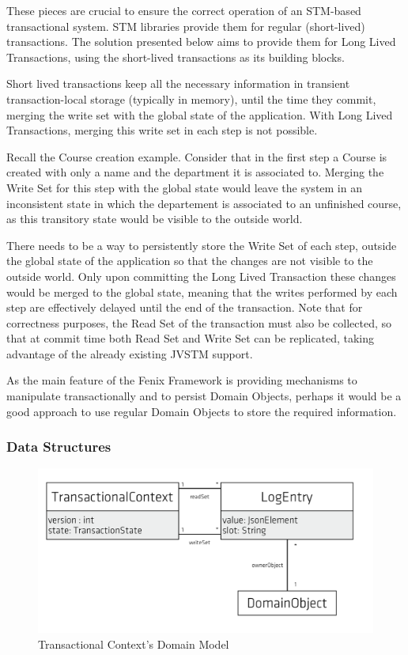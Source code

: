 \documentclass{llncs}
\begin{document}
These pieces are crucial to ensure the correct operation of an
STM-based transactional system. STM libraries provide them for regular
(short-lived) transactions. The solution presented below aims to
provide them for Long Lived Transactions, using the short-lived
transactions as its building blocks.

Short lived transactions keep all the necessary information in
transient transaction-local storage (typically in memory), until the
time they commit, merging the write set with the global state of the
application. With Long Lived Transactions, merging this write set in
each step is not possible.

Recall the Course creation example. Consider that in the first step a
Course is created with only a name and the department it is associated
to. Merging the Write Set for this step with the global state would
leave the system in an inconsistent state in which the departement is
associated to an unfinished course, as this transitory state would be
visible to the outside world.

There needs to be a way to persistently store the Write Set of each
step, outside the global state of the application so that the changes
are not visible to the outside world. Only upon committing the Long
Lived Transaction these changes would be merged to the global state,
meaning that the writes performed by each step are effectively delayed
until the end of the transaction. Note that for correctness purposes,
the Read Set of the transaction must also be collected, so that at
commit time both Read Set and Write Set can be replicated, taking
advantage of the already existing JVSTM support.

As the main feature of the Fenix Framework is providing mechanisms to
manipulate transactionally and to persist Domain Objects, perhaps it
would be a good approach to use regular Domain Objects to store the
required information.

\subsubsection{Data Structures}

\begin{figure}
\centering
\includegraphics[width=0.5\linewidth]{tx-context}
\caption{Transactional Context's Domain Model}
\label{fig:transactionalContext}
\end{figure}
\end{document}
